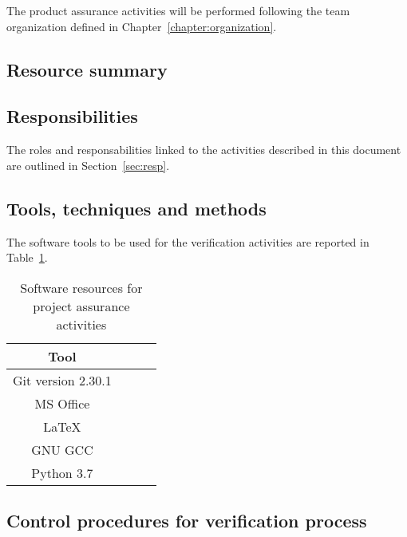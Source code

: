 The product assurance activities will be performed following the team organization defined in Chapter~\ref{chapter:organization}.


\subsection{Resource summary}


\subsection{Responsibilities}

The roles and responsabilities linked to the activities described in this document are outlined in Section~\ref{sec:resp}.

%

\subsection{Tools, techniques and methods}

The software tools to be used for the verification activities are reported in Table~\ref{table:verification_tools}.

\begin{table}[H]
\centering
\begin{tabular}{||c|c|c|c||}
 \hline
 \textbf{Tool} \\
 \hline
 Git version 2.30.1 \\
 \hline
 MS Office \\
 \hline
 LaTeX  \\
 \hline
 GNU GCC \\
 \hline
 Python 3.7 \\
 \hline

\end{tabular}
\caption{Software resources for project assurance activities}
\label{table:verification_tools}
\end{table}

\subsection{Control procedures for verification process}

